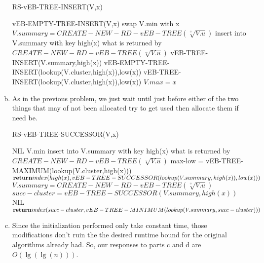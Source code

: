 \documentclass{article}
\begin{document}
\begin{enumerate}[a.]
\begin{algorithm}
\caption{RS-vEB-TREE-INSERT(V,x)}
\begin{algorithmic}
\State vEB-EMPTY-TREE-INSERT(V,x)
\Else
	\State swap V.min with x
	\EndIf
	\State $V.summary = CREATE-NEW-RD-vEB-TREE(\sqrt[+]{V.u})$
	\EndIf
	\State insert into V.summary with key high(x) what is returned by $CREATE-NEW-RD-vEB-TREE(\sqrt[-]{V.u})$
	\EndIf
	\State vEB-TREE-INSERT(V.summary,high(x))
	\State vEB-EMPTY-TREE-INSERT(lookup(V.cluster,high(x)),low(x))
	\Else
	\State vEB-TREE-INSERT(lookup(V.cluster,high(x)),low(x))
	\EndIf
	\EndIf
	\State $V.max = x$
	\EndIf
\EndIf
\end{algorithmic}
\end{algorithm}

\item

As in the previous problem, we just wait until just before either of the two things that may of not been allocated try to get used then allocate them if need be.
\begin{algorithm}
\caption{RS-vEB-TREE-SUCCESSOR(V,x)}
\begin{algorithmic}
\State {}
\Else
\State \Return NIL
\EndIf
{}
\State\Return V.min
\Else
{}
\State insert into V.summary with key high(x) what is returned by $CREATE-NEW-RD-vEB-TREE(\sqrt[-]{V.u})$
\EndIf
\State max-low = vEB-TREE-MAXIMUM(lookup(V.cluster,high(x)))
\State $\Return index(high(x),vEB-TREE-SUCCESSOR(lookup(V.summary,high(x)),low(x)))$
\Else
{}
\State $V.summary = CREATE-NEW-RD-vEB-TREE(\sqrt[+]{V.u})$
\EndIf
\State $succ-cluster = vEB-TREE-SUCCESSOR(V.summary,high(x))$
\State\Return NIL
\Else
\State $\Return index(succ-cluster,vEB-TREE-MINIMUM(lookup(V.summary,succ-cluster)))$
\EndIf
\EndIf
\EndIf
\end{algorithmic}
\end{algorithm}

\item
Since the initialization performed only take constant time, those modifications don't ruin the the desired runtime bound for the original algorithms already had. So, our responses to parts c and d are $O(\lg(\lg(n)))$.


\end{enumerate}
\end{document}
